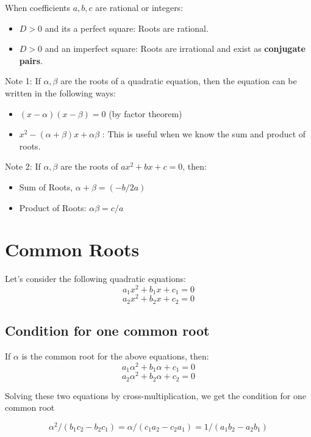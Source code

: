 \documentclass{book}
\begin{document}
	When coefficients $a,b,c$ are rational or integers:
	\begin{itemize}
		\item $D>0$ and its a perfect square: Roots are rational.
		\item $D>0$ and an imperfect square: Roots are irrational and exist as \textbf{conjugate pairs}.
	\end{itemize}
	
	\begin{mdframed}[backgroundcolor=yellow]
		Note 1: If $\alpha, \beta$ are the roots of a quadratic equation, then the equation can be written in the following ways:
		\begin{itemize}
			\item $(x - \alpha)(x - \beta) = 0$ (by factor theorem)
			\item $x^2 - (\alpha + \beta)x + \alpha\beta$ : This is useful when we know the sum and product of roots.
		\end{itemize}
	\end{mdframed}
	\begin{mdframed}[backgroundcolor=yellow]
		Note 2: If $\alpha, \beta$ are the roots of $ax^2 + bx + c = 0$, then:
		\begin{itemize}
			\item Sum of Roots, $\alpha + \beta = {(-b/2a)}$
			\item Product of Roots: $\alpha\beta = c/a$
		\end{itemize}
	\end{mdframed}
	
	\section{Common Roots}
	Let's consider the following quadratic equations:
	$$a_1x^2 + b_1x + c_1 = 0$$
	$$a_2x^2 + b_2x + c_2 = 0$$
	
	\subsection{Condition for one common root}
	If $\alpha$ is the common root for the above equations, then:
	$$a_1\alpha^2 + b_1\alpha + c_1 = 0$$
	$$a_2\alpha^2 + b_2\alpha + c_2 = 0$$
	
	Solving these two equations by cross-multiplication, we get the condition for one common root
	
	\begin{mdframed}[backgroundcolor=yellow]
		$$\alpha^2 / {(b_1c_2 - b_2c_1)} = \alpha/{(c_1a_2-c_2a_1) = 1/{(a_1b_2 - a_2b_1)}}$$
	\end{mdframed}
	
\end{document}
